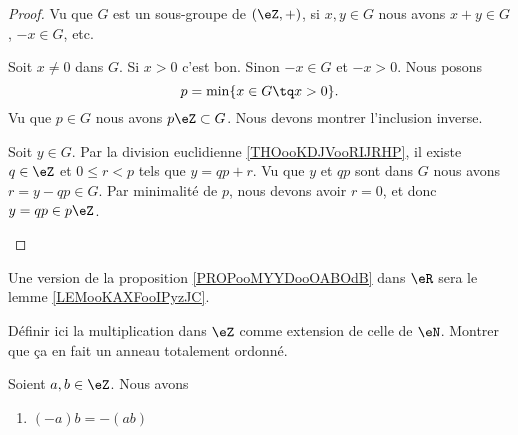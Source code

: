 \begin{proof}
	Vu que \( G\) est un sous-groupe de \( (\eZ,+)\), si \( x,y\in G\) nous avons \( x+y\in G\), \( -x\in G\), etc.
	\begin{subproof}
		Soit \( x\neq 0\) dans \( G\). Si \( x>0\) c'est bon. Sinon \( -x\in G\) et \( -x>0\).
		Nous posons
		\begin{equation}
			p=\min\{ x\in G\tq x>0 \}.
		\end{equation}
		Vu que \( p\in G\) nous avons \( p\eZ\subset G\). Nous devons montrer l'inclusion inverse.

		Soit \( y\in G\). Par la division euclidienne \ref{THOooKDJVooRIJRHP}, il existe \( q\in \eZ\) et \( 0\leq r<p\) tels que \( y=qp+r\). Vu que \( y\) et \( qp\) sont dans \( G\) nous avons \( r=y-qp\in G\). Par minimalité de \( p\), nous devons avoir \( r=0\), et donc \( y=qp\in p\eZ\).
	\end{subproof}
\end{proof}


\begin{normaltext}	\label{NORMooOrdreEntiersRelatifsExtension}
	Une version de la proposition \ref{PROPooMYYDooOABOdB} dans \( \eR\) sera le lemme \ref{LEMooKAXFooIPyzJC}.
\end{normaltext}

\begin{probleme}	\label{TODOooDefinirMultiplicationRelatifs}
	Définir ici la multiplication dans \( \eZ \) comme extension de celle de \( \eN \). Montrer que ça en fait un anneau totalement ordonné.
\end{probleme}


\begin{proposition}	\label{PROPooJMETooHQGwnv}
	Soient \( a,b\in \eZ\). Nous avons
	\begin{enumerate}
		\item		\label{ITEMooWNYGooMopPcq}
		      \( (-a)b=-(ab)\)
	\end{enumerate}
\end{proposition}

